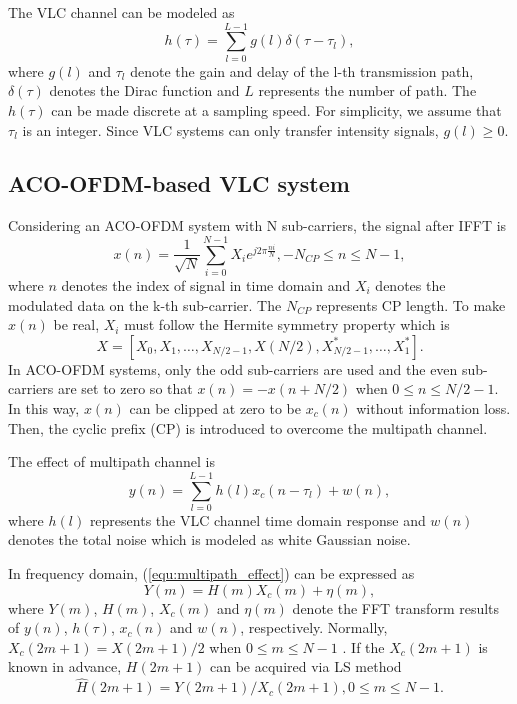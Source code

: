 \documentclass[10pt,journal]{IEEEtran}
\begin{document}
		The VLC channel can be modeled as
        \begin{equation}\label{channel_model}
          h(\tau)=\sum_{l=0}^{L-1}g(l)\delta(\tau-\tau_l),
        \end{equation}
        where $g(l)$ and $\tau_l$ denote the gain and delay of the l-th transmission path, $\delta(\tau)$ denotes the Dirac function and $L$ represents the number of path.
        The $h(\tau)$ can be made discrete at a sampling speed.
        For simplicity, we assume that $\tau_l$ is an integer.
        Since VLC systems can only transfer intensity signals, $g(l)\geq0$.

    \subsection{ACO-OFDM-based VLC system}
		Considering an ACO-OFDM system with N sub-carriers, the signal after IFFT is
		\begin{equation}\label{equ:ACO_OFDM_base}
          x(n)=\frac{1}{\sqrt{N}}\sum_{i=0}^{N-1}X_{i}e^{j2\pi\frac{ni}{N}},-N_{CP}\leq n \leq N-1,
        \end{equation}
        where $n$ denotes the index of signal in time domain and $X_{i}$ denotes the modulated data on the k-th sub-carrier. The $N_{CP}$ represents CP length.
        To make $x(n)$ be real, $X_{i}$ must follow the Hermite symmetry property which is
		\begin{equation}\label{equ:Hermite_symmetry}
          X=[X_0,X_1,\ldots,X_{N/2-1},X(N/2),X_{N/2-1}^{*},\ldots,X_{1}^{*}].
        \end{equation}
		In ACO-OFDM systems, only the odd sub-carriers are used and the even sub-carriers are set to zero so that $ x(n)=-x(n+N/2) $ when $
0\leq n\leq N/2-1 $. In this way, $ x(n) $ can be clipped at zero to be $ x_c(n) $ without information loss. Then, the cyclic prefix (CP) is introduced to overcome the multipath channel.

		The effect of multipath channel is
        \begin{equation}\label{equ:multipath_effect}
          y(n)=\sum_{l=0}^{L-1}h(l)x_c(n-\tau_l)+w(n),
        \end{equation}
        where $h(l)$ represents the VLC channel time domain response and $w(n)$ denotes the total noise which is modeled as white Gaussian noise\cite{Narmanlioglu2015}.

        In frequency domain, (\ref{equ:multipath_effect}) can be expressed as
        \begin{equation}\label{equ:multipath_effect_frequency}
          Y(m)=H(m)X_c(m)+\eta(m),
        \end{equation}
        where $Y(m)$, $H(m)$, $X_c(m)$ and $\eta(m)$ denote the FFT transform results of $y(n)$, $h(\tau)$, $x_c(n)$ and $w(n)$, respectively. Normally, $X_c(2m+1) = X(2m+1)/2 $ when $0\leq m\leq N-1$ \cite{Wang2017Optical}.
        If the $X_c(2m+1)$ is known in advance, $H(2m+1)$ can be acquired via LS method
        \begin{equation}\label{equ:LS}
          \widehat{H}(2m+1) = Y(2m+1) / X_c(2m+1), 0\leq m\leq N-1.
        \end{equation}
\end{document}
